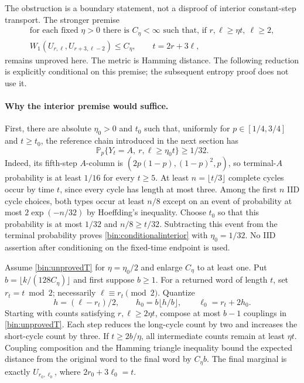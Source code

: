 The obstruction is a boundary statement, not a disproof of interior constant-step transport. The stronger premise
\begin{equation}
 \begin{gathered}
 \text{for each fixed }\eta>0\text{ there is }C_\eta<\infty
 \text{ such that, if }r,\ell\ge\eta t,\ \ell\ge2,\\
 W_1(U_{r,\ell},U_{r+3,\ell-2})\le C_\eta,
 \qquad t=2r+3\ell,
 \end{gathered}
 \label{bin:unprovedT}
\end{equation}
remains unproved here. The metric is Hamming distance. The following reduction is explicitly conditional on this premise; the subsequent entropy proof does not use it.

\paragraph{Why the interior premise would suffice.}
First, there are absolute $\eta_0>0$ and $t_0$ such that, uniformly for $p\in[1/4,3/4]$ and $t\ge t_0$, the reference chain introduced in the next section has
\begin{equation}
 \mathbb P_p\{Y_t=A,\ r,\ell\ge\eta_0t\}\ge1/32.
 \label{bin:conditionalinterior}
\end{equation}
Indeed, its fifth-step $A$-column is $(2p(1-p),(1-p)^2,p)$, so terminal-$A$ probability is at least $1/16$ for every $t\ge5$. At least $n=\lfloor t/3\rfloor$ complete cycles occur by time $t$, since every cycle has length at most three. Among the first $n$ IID cycle choices, both types occur at least $n/8$ except on an event of probability at most $2\exp(-n/32)$ by Hoeffding's inequality. Choose $t_0$ so that this probability is at most $1/32$ and $n/8\ge t/32$. Subtracting this event from the terminal probability proves \eqref{bin:conditionalinterior} with $\eta_0=1/32$. No IID assertion after conditioning on the fixed-time endpoint is used.

Assume \eqref{bin:unprovedT} for $\eta=\eta_0/2$ and enlarge $C_\eta$ to at least one. Put $b=\lfloor k/(128C_\eta)\rfloor$ and first suppose $b\ge1$. For a returned word of length $t$, set $r_t=t\bmod2$; necessarily $\ell\equiv r_t\pmod2$. Quantize
\[
 h=(\ell-r_t)/2,\qquad h_0=b\lfloor h/b\rfloor,
 \qquad\ell_0=r_t+2h_0.
\]
Starting with counts satisfying $r,\ell\ge2\eta t$, compose at most $b-1$ couplings in \eqref{bin:unprovedT}. Each step reduces the long-cycle count by two and increases the short-cycle count by three. If $t\ge2b/\eta$, all intermediate counts remain at least $\eta t$. Coupling composition and the Hamming triangle inequality bound the expected distance from the original word to the final word by $C_\eta b$. The final marginal is exactly $U_{r_0,\ell_0}$, where $2r_0+3\ell_0=t$.

